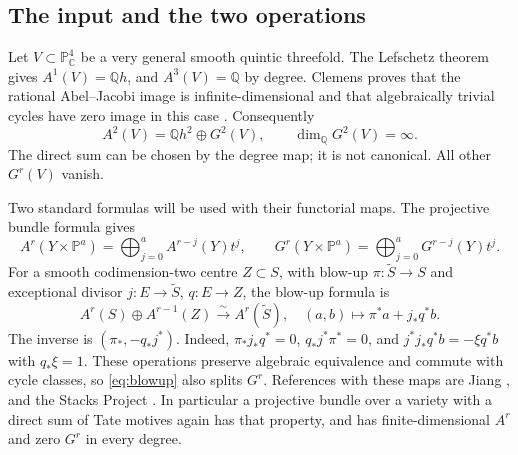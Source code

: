\documentclass[11pt]{article}
\newcommand{\Q}{\mathbb Q}
\newcommand{\C}{\mathbb C}
\newcommand{\PP}{\mathbb P}
\theoremstyle{definition}
\theoremstyle{remark}
\begin{document}
\subsection{The input and the two operations}

Let $V\subset\PP^4_\C$ be a very general smooth quintic threefold. The Lefschetz theorem gives $A^1(V)=\Q h$, and $A^3(V)=\Q$ by degree. Clemens proves that the rational Abel--Jacobi image is infinite-dimensional and that algebraically trivial cycles have zero image in this case \cite[equation~(0.1), Theorem~(0.2), p.~19; genericity on p.~20]{Clemens}. Consequently
\[
 A^2(V)=\Q h^2\oplus G^2(V),\qquad
                       \dim_\Q G^2(V)=\infty.
\]
The direct sum can be chosen by the degree map; it is not canonical. All other $G^r(V)$ vanish.

Two standard formulas will be used with their functorial maps. The projective bundle formula gives
\begin{equation}\label{eq:projective}
 A^r(Y\times\PP^a)=\bigoplus_{j=0}^a A^{r-j}(Y)t^j,
 \qquad
 G^r(Y\times\PP^a)=\bigoplus_{j=0}^a G^{r-j}(Y)t^j.
\end{equation}
For a smooth codimension-two centre $Z\subset S$, with blow-up $\pi:\widetilde S\to S$ and exceptional divisor $j:E\to\widetilde S$, $q:E\to Z$, the blow-up formula is
\begin{equation}\label{eq:blowup}
 A^r(S)\oplus A^{r-1}(Z)\xrightarrow{\sim}A^r(\widetilde S),
           \quad(a,b)\longmapsto\pi^*a+j_*q^*b.
\end{equation}
The inverse is $(\pi_*,-q_*j^*)$. Indeed, $\pi_*j_*q^*=0$, $q_*j^*\pi^*=0$, and $j^*j_*q^*b=-\xi q^*b$ with $q_*\xi=1$. These operations preserve algebraic equivalence and commute with cycle classes, so \eqref{eq:blowup} also splits $G^r$. References with these maps are Jiang \cite[Theorems~2.4 and~2.8(3)]{Jiang}, and the Stacks Project \cite[Tags 02TX and 0FGQ]{Stacks}. In particular a projective bundle over a variety with a direct sum of Tate motives again has that property, and has finite-dimensional $A^r$ and zero $G^r$ in every degree.
\end{document}
